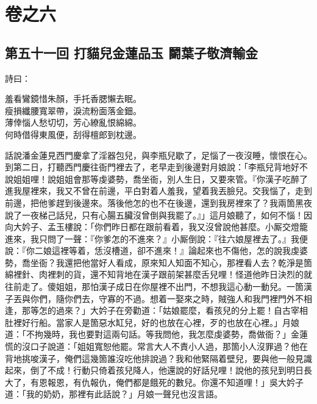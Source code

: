\part*{{\titlename}卷之六}



\chapter*{第五十一回 打貓兒金蓮品玉 鬬葉子敬濟輸金}


詩曰：

\begin{myquote} 
羞看鸞鏡惜朱顏，手托香腮懶去眠。\\瘦損纖腰寬翠帶，淚流粉面落金鈿。\\薄倖惱人愁切切，芳心繚亂恨綿綿。\\何時借得東風便，刮得檀郎到枕邊。
\end{myquote} 

話說潘金蓮見西門慶拿了淫器包兒，與李瓶兒歇了，足惱了一夜沒睡，{}懷恨在心。到第二日，打聽西門慶往衙門裡去了，老早走到後邊對月娘說：「李瓶兒背地好不說姐姐哩！說姐姐會那等虔婆勢，喬坐衙，別人生日，又要來管。『你漢子吃醉了進我屋裡來，我又不曾在前邊，平白對着人羞我，望着我丟臉兒。交我惱了，走到前邊，把他爹趕到後邊來。落後他怎的也不在後邊，還到我房裡來了？我兩箇黑夜說了一夜梯己話兒，只有心腸五臟沒曾倒與我罷了。』」{}這月娘聽了，如何不惱！因向大妗子、孟玉樓說：「你們昨日都在跟前看着，我又沒曾說他甚麼。小厮交燈籠進來，我只問了一聲：『你爹怎的不進來？』小厮倒說：『往六娘屋裡去了。』我便說：『你二娘這裡等着，恁沒槽道，卻不進來！』論起來也不傷他，怎的說我虔婆勢，喬坐衙？我還把他當好人看成，原來知人知面不知心，那裡看人去？乾淨是箇綿裡針、肉裡刺的貨，還不知背地在漢子跟前架甚麼舌兒哩！{}怪道他昨日決烈的就往前走了。傻姐姐，那怕漢子成日在你屋裡不出門，不想我這心動一動兒。{}一箇漢子丟與你們，隨你們去，守寡的不過。想着一娶來之時，賊強人和我門裡門外不相逢，那等怎的過來？」{}大妗子在旁勸道：「姑娘罷麼，看孩兒的分上罷！自古宰相肚裡好行船。當家人是箇惡水缸兒，好的也放在心裡，歹的也放在心裡。」月娘道：「不拘幾時，我也要對這兩句話。等我問他，我怎麼虔婆勢，喬做衙？」金蓮慌的沒口子說道：「姐姐寬恕他罷。常言大人不責小人過，那箇小人沒罪過？{}他在背地挑唆漢子，俺們這幾箇誰沒吃他排說過？我和他緊隔着壁兒，要與他一般見識起來，倒了不成！行動只倚着孩兒降人，他還說的好話兒哩！說他的孩兒到明日長大了，有恩報恩，有仇報仇，俺們都是餓死的數兒。你還不知道哩！」吳大妗子道：「我的奶奶，那裡有此話說？」{}月娘一聲兒也沒言語。

